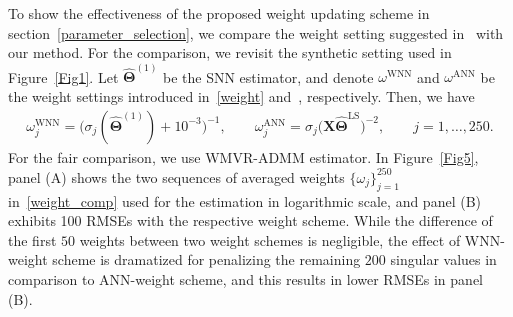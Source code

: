 \documentclass[alpha-refs]{wiley-article}
\begin{document}
To show the effectiveness of the proposed weight updating scheme in section~\ref{parameter_selection},
we compare the weight setting suggested in~\citet{chen2013reduced} with our method.
For the comparison, we revisit the synthetic setting used in Figure~\ref{Fig1}.
Let $\widehat{\boldsymbol{\Theta}}^{(1)}$ be the SNN estimator, and denote $\omega^{\text{WNN}}$
and $\omega^{\text{ANN}}$ be the weight settings introduced in~\eqref{weight} and~\citet{chen2013reduced}, respectively.
Then, we have
\begin{align} \label{weight_comp}
    \omega_{j}^{\text{WNN}} =
    \big(\sigma_{j}(\widehat{\boldsymbol{\Theta}}^{(1)})+10^{-3}\big)^{-1},
    \qquad
    \omega_{j}^{\text{ANN}} =
    \sigma_{j}\big( \boldsymbol{X}\widehat{\boldsymbol{\Theta}}^{\text{LS}} \big)^{-2},
    \qquad j=1,\dots,250.
\end{align}
For the fair comparison, we use WMVR-ADMM estimator.
In Figure~\ref{Fig5}, panel (A) shows the two sequences of averaged weights $\{\omega_{j}\}_{j=1}^{250}$ in~\eqref{weight_comp} used for the estimation in logarithmic scale,
and panel (B) exhibits 100 RMSEs with the respective weight scheme.
While the difference of the first $50$ weights between two weight schemes is negligible, the effect of WNN-weight scheme is dramatized for penalizing the remaining $200$ singular values in comparison to ANN-weight scheme, and this results in lower RMSEs in panel (B).
\end{document}
